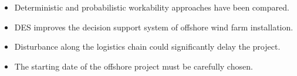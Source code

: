 \begin{highlights}
    \begin{itemize}
        \item Deterministic and probabilistic workability approaches have been compared.
        \item DES improves the decision support system of offshore wind farm installation.
        \item Disturbance along the logistics chain could significantly delay the project.
        \item The starting date of the offshore project must be carefully chosen.
    \end{itemize}
\end{highlights}